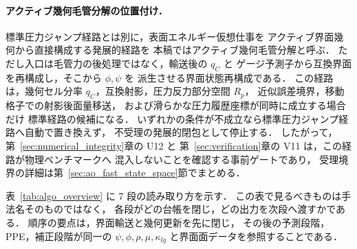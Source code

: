 \paragraph{アクティブ幾何毛管分解の位置付け．}
標準圧力ジャンプ経路とは別に，表面エネルギー仮想仕事を
アクティブ界面幾何から直接構成する発展的経路を
本稿ではアクティブ幾何毛管分解と呼ぶ．
ただし入口は毛管力の後処理ではなく，輸送後の $q_C$ と
ゲージ予測子から互換界面を再構成し，そこから $\phi,\psi$ を
派生させる界面状態再構成である．
この経路は，幾何セル分率 $q_C$，互換射影，圧力反力部分空間 $R_p$，
近似誤差境界，移動格子での射影後面量移送，
および滑らかな圧力履歴座標が同時に成立する場合だけ
標準経路の候補になる．
いずれかの条件が不成立なら標準圧力ジャンプ経路へ自動で置き換えず，
不受理の発展的閉包として停止する．
したがって，第~\ref{sec:numerical_integrity}章の U12 と
第~\ref{sec:verification}章の V11 は，この経路が物理ベンチマークへ
混入しないことを確認する事前ゲートであり，
受理境界の詳細は第~\ref{sec:ao_fast_state_space}節でまとめる．

表~\ref{tab:algo_overview} に 7 段の読み取り方を示す．
この表で見るべきものは手法名そのものではなく，
各段がどの台帳を閉じ，どの出力を次段へ渡すかである．
順序の要点は，界面輸送と幾何更新を先に閉じ，
その後の予測段階，PPE，補正段階が同一の
$\psi,\phi,\rho,\mu,\kappa_{lg}$ と界面面データを参照することである．

